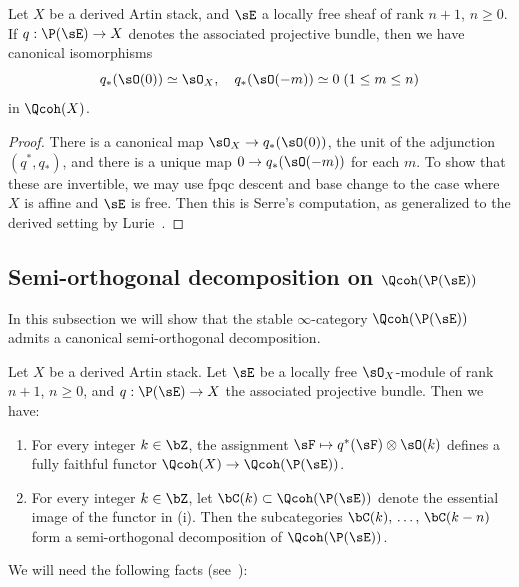\begin{prop}[Serre]\label{prop:Serre}
Let $X$ be a derived Artin stack, and $\sE$ a locally free sheaf of rank $n+1$, $n\ge 0$. If $q : \P(\sE) \to X$ denotes the associated projective bundle, then we have canonical isomorphisms
\[
q_*(\sO(0)) \simeq \sO_X,\quad q_*(\sO(-m)) \simeq 0 \; (1\le m\le n)
\]
in $\Qcoh(X)$.
\end{prop}

\begin{proof}
There is a canonical map $\sO_X \to q_*(\sO(0))$, the unit of the adjunction $(q^*,q_*)$, and there is a unique map $0 \to q_*(\sO(-m))$ for each $m$. To show that these are invertible, we may use fpqc descent and base change to the case where $X$ is affine and $\sE$ is free. Then this is Serre's computation, as generalized to the derived setting by Lurie~\cite[Theorem.~5.4.2.6]{SAG-20180204}.
\end{proof}

\subsection{Semi-orthogonal decomposition on \texorpdfstring{$\Qcoh(\P(\sE))$}{Qcoh(P(E))}}\label{ssec:proj/qcoh}

In this subsection we will show that the stable $\infty$-category $\Qcoh(\P(\sE))$ admits a canonical semi-orthogonal decomposition.

\begin{theo}\label{thm:Qcoh(P(E))}
Let $X$ be a derived Artin stack. Let $\sE$ be a locally free $\sO_X$-module of rank $n+1$, $n\ge 0$, and $q : \P(\sE) \to X$ the associated projective bundle. Then we have:
\begin{enumerate}\romanenumi
\item\label{item:Qcoh(P(E))/fully faithful}
For every integer $k\in\bZ$, the assignment $\sF \mapsto q^*(\sF)\otimes\sO(k)$ defines a fully faithful functor $\Qcoh(X) \to \Qcoh(\P(\sE))$.
\item\label{item:Qcoh(P(E))/SOD}
For every integer $k\in\bZ$, let $\bC(k) \subset \Qcoh(\P(\sE))$ denote the essential image of the functor in (i). Then the subcategories $\bC(k),\,\ldots,\,\bC(k-n)$ form a semi-orthogonal decomposition of $\Qcoh(\P(\sE))$.
\end{enumerate}
\end{theo}

We will need the following facts (see~\cite[Lemmas~7.2.2.2 and 5.6.2.2]{SAG-20180204}):

